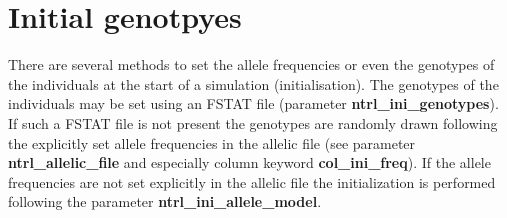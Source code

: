 \documentclass[letterpaper,12pt,oneside]{book}
\begin{document}
\section{Initial genotpyes}\label{iniGenoNtrl}
There are several methods to set the allele frequencies or even the genotypes of the individuals at the start of a simulation (initialisation). The genotypes of the individuals may be set using an FSTAT file \citep{Goudet_1995} (parameter \textbf{ntrl\_ini\_genotypes}). If such a FSTAT file is not present the genotypes are randomly drawn following the explicitly set allele frequencies in the allelic file (see parameter \textbf{ntrl\_allelic\_file} and especially column keyword \textbf{col\_ini\_freq}). If the allele frequencies are not set explicitly in the allelic file the initialization is performed following the parameter \textbf{ntrl\_ini\_allele\_model}.  
\end{document}
